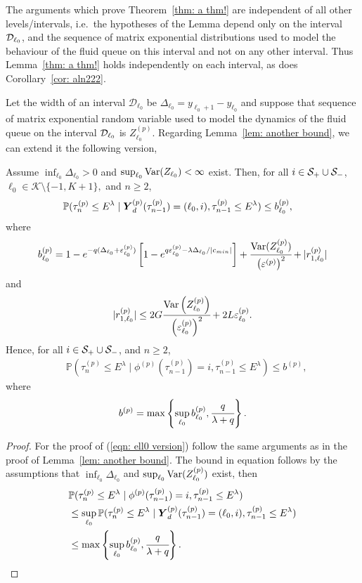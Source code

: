 The arguments which prove Theorem~\ref{thm: a thm!} are independent of all other levels/intervals, i.e.~the hypotheses of the Lemma depend only on the interval \(\mathcal{D}_{\ell_0}\), and the sequence of matrix exponential distributions used to model the behaviour of the fluid queue on this interval and not on any other interval. Thus Lemma~\ref{thm: a thm!} holds independently on each interval, as does Corollary~\ref{cor: aln222}.

Let the width of an interval \(\mathcal D_{\ell_0}\) be \(\Delta_{\ell_0}=y_{\ell_0+1}-y_{\ell_0}\) and suppose that sequence of matrix exponential random variable used to model the dynamics of the fluid queue on the interval \(\mathcal{D}_{\ell_0}\) is \(Z_{\ell_0}^{(p)}\). Regarding Lemma~\ref{lem: another bound}, we can extend it the following version, 
\begin{lem}\label{lem: another bound sdfg}
	Assume \(\inf_{\ell_0}\Delta_{\ell_0}>0\) and \(\sup_{\ell_0}\mathrm{Var}(Z_{\ell_0})<\infty\) exist. Then, for all \(i\in\mathcal S_+\cup \mathcal{S}_-\), \(\ell_0\in\mathcal K\setminus\{-1,K+1\},\) and \(n\geq 2\), 
	\begin{align}
		&\mathbb P(\tau_n^{(p)}\leq E^\lambda \mid \boldsymbol Y_d^{(p)}(\tau_{n-1}^{(p)}) = (\ell_0,i), \tau_{n-1}^{(p)}\leq  E^\lambda ) \leq b_{\ell_0}^{(p)},\label{eqn: ell0 version}
	\end{align}
	where 
	\[b_{\ell_0}^{(p)} = 1-e^{-q(\Delta_{\ell_0}+\varepsilon_{\ell_0}^{(p)})}\left[1-e^{q\varepsilon_{\ell_0}^{(p)}-\lambda \Delta_{\ell_0}/|c_{min}|}\right] + \cfrac{\mathrm{Var}(Z_{\ell_0}^{(p)})}{\left(\varepsilon^{(p)}\right)^2} + |r_{1,\ell_0}^{(p)}| \]
	and  
	\[|r_{1,\ell_0}^{(p)}|\leq 2G\cfrac{\mathrm{Var} \left(Z_{\ell_0}^{(p)}\right)}{\left(\varepsilon_{\ell_0}^{(p)}\right)^2} + 2L\varepsilon_{\ell_0}^{(p)}.\]
	Hence, for all \(i\in\mathcal S_+\cup \mathcal{S}_-\), and \(n\geq 2\), 
	\begin{align}
		&\mathbb P(\tau_n^{(p)}\leq E^\lambda \mid \phi^{(p)}(\tau_{n-1}^{(p)})=i, \tau_{n-1}^{(p)}\leq  E^\lambda ) \leq b^{(p)}, \label{eqn: skjhg}
	\end{align}
	where 
	\[b^{(p)} = \max\left\{\sup_{\ell_0}b_{\ell_0}^{(p)}, \cfrac{q}{\lambda + q}\right\}.\]
\end{lem}
\begin{proof}
	For the proof of (\ref{eqn: ell0 version}) follow the same arguments as in the proof of Lemma~\ref{lem: another bound}. The bound in equation follows by the assumptions that \(\inf_{\ell_0}\Delta_{\ell_0}\) and \(\sup_{\ell_0}\mathrm{Var}(Z_{\ell_0}^{(p)})\) exist, then 
	\begin{align*}
		&\mathbb P(\tau_n^{(p)}\leq E^\lambda \mid \phi^{(p)}(\tau_{n-1}^{(p)})=i, \tau_{n-1}^{(p)}\leq  E^\lambda ) 
		\\&\leq \sup_{\ell_0} \mathbb P(\tau_n^{(p)}\leq E^\lambda \mid \boldsymbol Y_d^{(p)}(\tau_{n-1}^{(p)}) = (\ell_0, i), \tau_{n-1}^{(p)}\leq  E^\lambda ) 
		\\&\leq \max\left\{\sup_{\ell_0}b_{\ell_0}^{(p)}, \cfrac{q}{\lambda + q}\right\}.
	\end{align*}
\end{proof}
